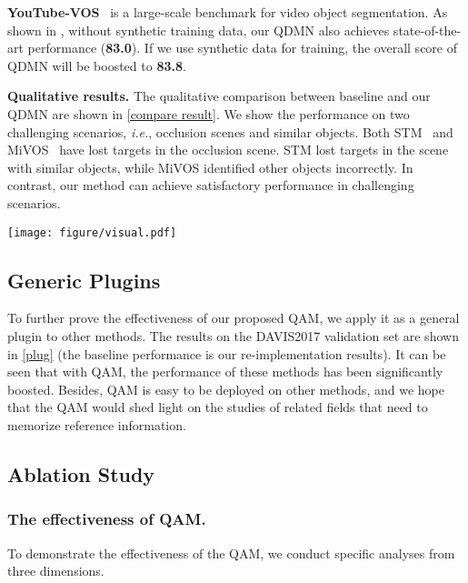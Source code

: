 \documentclass[runningheads]{llncs}
\begin{document}
    \noindent \textbf{YouTube-VOS}~\cite{youtube} is a large-scale benchmark for video object segmentation.
    As shown in , without synthetic training data, our QDMN also achieves state-of-the-art performance (\textbf{83.0}). If we use synthetic data for training, the overall score of QDMN will be boosted to \textbf{83.8}.
        
    
    \noindent \textbf{{Qualitative results.}} The qualitative comparison between baseline and our QDMN are shown in \cref{compare result}. We show the performance on two challenging scenarios, \textit{i.e.}, occlusion scenes and similar objects. 
    Both STM~\cite{stm} and MiVOS~\cite{mivos} have lost targets in the occlusion scene. STM lost targets in the scene with similar objects, while MiVOS identified other objects incorrectly. In contrast, our method can achieve satisfactory performance in challenging scenarios.
    
    
    
    \begin{figure*}[t]
    \centering
    \texttt{[image: figure/visual.pdf]}
    \caption{Visual comparison of QDMN with baseline methods.Each row demonstrates five frames sampled from a video sequence.}
    \label{compare result}
\end{figure*}
     


    
    
    \subsection{Generic Plugins}
    To further prove the effectiveness of our proposed QAM, we apply it as a general plugin to other methods. 
    The results on the DAVIS2017 validation set are shown in \cref{plug} (the baseline performance is our re-implementation results). 
    It can be seen that with QAM, the performance of these methods has been significantly boosted. 
    Besides, QAM is easy to be deployed on other methods, and we hope that the QAM would shed light on the studies of related fields that need to memorize reference information.
    
    
    

\subsection{Ablation Study}\label{ablation study}


    \subsubsection{The effectiveness of QAM.}
    To demonstrate the effectiveness of the QAM, we conduct specific analyses from three dimensions.
\end{document}

